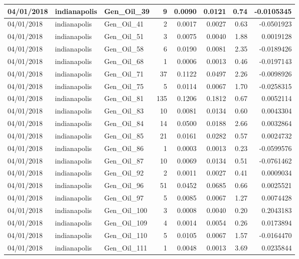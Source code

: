 \documentclass[
  letterpaper,
  DIV=11,
  numbers=noendperiod]{scrartcl}
\begin{document}
\begin{tabular}{l|l|l|r|r|r|r|r}
\hline
04/01/2018 & indianapolis & Gen\_Oil\_39 & 9 & 0.0090 & 0.0121 & 0.74 & -0.0105345\\
\hline
04/01/2018 & indianapolis & Gen\_Oil\_41 & 2 & 0.0017 & 0.0027 & 0.63 & -0.0501923\\
\hline
04/01/2018 & indianapolis & Gen\_Oil\_51 & 3 & 0.0075 & 0.0040 & 1.88 & 0.0019128\\
\hline
04/01/2018 & indianapolis & Gen\_Oil\_58 & 6 & 0.0190 & 0.0081 & 2.35 & -0.0189426\\
\hline
04/01/2018 & indianapolis & Gen\_Oil\_68 & 1 & 0.0006 & 0.0013 & 0.46 & -0.0197143\\
\hline
04/01/2018 & indianapolis & Gen\_Oil\_71 & 37 & 0.1122 & 0.0497 & 2.26 & -0.0098926\\
\hline
04/01/2018 & indianapolis & Gen\_Oil\_75 & 5 & 0.0114 & 0.0067 & 1.70 & -0.0258315\\
\hline
04/01/2018 & indianapolis & Gen\_Oil\_81 & 135 & 0.1206 & 0.1812 & 0.67 & 0.0052114\\
\hline
04/01/2018 & indianapolis & Gen\_Oil\_83 & 10 & 0.0081 & 0.0134 & 0.60 & 0.0043304\\
\hline
04/01/2018 & indianapolis & Gen\_Oil\_84 & 14 & 0.0500 & 0.0188 & 2.66 & 0.0032864\\
\hline
04/01/2018 & indianapolis & Gen\_Oil\_85 & 21 & 0.0161 & 0.0282 & 0.57 & 0.0024732\\
\hline
04/01/2018 & indianapolis & Gen\_Oil\_86 & 1 & 0.0003 & 0.0013 & 0.23 & -0.0599576\\
\hline
04/01/2018 & indianapolis & Gen\_Oil\_87 & 10 & 0.0069 & 0.0134 & 0.51 & -0.0761462\\
\hline
04/01/2018 & indianapolis & Gen\_Oil\_92 & 2 & 0.0011 & 0.0027 & 0.41 & 0.0009034\\
\hline
04/01/2018 & indianapolis & Gen\_Oil\_96 & 51 & 0.0452 & 0.0685 & 0.66 & 0.0025521\\
\hline
04/01/2018 & indianapolis & Gen\_Oil\_97 & 5 & 0.0085 & 0.0067 & 1.27 & 0.0074428\\
\hline
04/01/2018 & indianapolis & Gen\_Oil\_100 & 3 & 0.0008 & 0.0040 & 0.20 & 0.2043183\\
\hline
04/01/2018 & indianapolis & Gen\_Oil\_109 & 4 & 0.0014 & 0.0054 & 0.26 & 0.0173894\\
\hline
04/01/2018 & indianapolis & Gen\_Oil\_110 & 5 & 0.0105 & 0.0067 & 1.57 & -0.0164470\\
\hline
04/01/2018 & indianapolis & Gen\_Oil\_111 & 1 & 0.0048 & 0.0013 & 3.69 & 0.0235844\\

\end{tabular}
\end{document}
